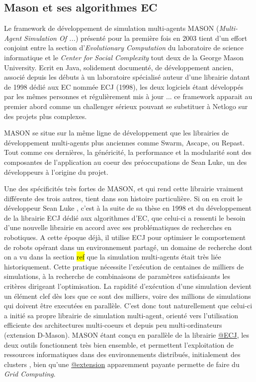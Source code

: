 \subsection{Mason et ses algorithmes EC}

Le framework de développement de simulation multi-agents MASON (\textit{Multi-Agent Simulation Of ...}) présenté pour la première fois en 2003 tient d'un effort conjoint entre la section d'\textit{Evolutionary Computation} du laboratoire de science informatique et le \textit{Center for Social Complexity} tout deux de la George Mason University. Ecrit en Java, solidement documenté, de développement ancien, associé depuis les débuts à un laboratoire spécialisé auteur d'une librairie datant de 1998 dédié aux EC nommée ECJ (1998), les deux logiciels étant développés par les mêmes personnes et régulièrement mis à jour ... ce framework apparait au premier abord comme un challenger sérieux pouvant se substituer à Netlogo sur des projets plus complexes.

MASON se situe sur la même ligne de développement que les librairies de développement multi-agents plus anciennes comme Swarm, Ascape, ou Repast. Tout comme ces dernières, la généricité, la performance et la modularité sont des composantes de l'application au coeur des préoccupations de Sean Luke, un des développeurs à l'origine du projet.

Une des spécificités très fortes de MASON, et qui rend cette librairie vraiment différente des trois autres, tient dans son histoire particulière. Si on en croit le développeur Sean Luke , c'est à la suite de sa thèse en 1998 et du développement de la librairie ECJ  dédié aux algorithmes d'EC, que celui-ci a ressenti le besoin d'une nouvelle librairie en accord avec ses problématiques de recherches en robotiques. A cette époque déjà, il utilise ECJ pour optimiser le comportement de robots opérant dans un environnement partagé, un domaine de recherche dont on a vu dans la section \hl{ref} que la simulation multi-agents était très liée historiquement. Cette pratique nécessite l'exécution de centaines de milliers de simulations, à la recherche de combinaisons de paramètres satisfaisants les critères dirigeant l'optimisation. La rapidité d'exécution d'une simulation devient un élément clef dès lors que ce sont des milliers, voire des millions de simulations qui doivent être executées en parallèle. C'est donc tout naturellement que celui-ci a initié sa propre librairie de simulation multi-agent, orienté vers l'utilisation efficiente des architectures multi-coeurs et depuis peu multi-ordinateurs (extension D-Mason). MASON étant conçu en parallèle de la librairie \href{http://cs.gmu.edu/~eclab/projects/ecj/}{@ECJ}, les deux outils fonctionnent très bien ensemble, et permettent l'exploitation de ressources informatiques dans des environnements distribués, initialement des clusters \autocite[211]{Luke2014}, bien qu'une \href{http://www.parabon.com/dev-center/origin}{@extension} apparemment payante permette de faire du \textit{Grid Computing}.

